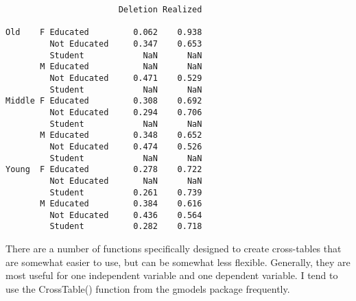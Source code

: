 \documentclass[
  12pt,
  letterpaper]{article}
\newenvironment{Shaded}{\begin{snugshade}}{\end{snugshade}}
\newcommand{\AttributeTok}[1]{\textcolor[rgb]{0.40,0.45,0.13}{#1}}
\newcommand{\CommentTok}[1]{\textcolor[rgb]{0.37,0.37,0.37}{#1}}
\newcommand{\ConstantTok}[1]{\textcolor[rgb]{0.56,0.35,0.01}{#1}}
\newcommand{\DecValTok}[1]{\textcolor[rgb]{0.68,0.00,0.00}{#1}}
\newcommand{\FunctionTok}[1]{\textcolor[rgb]{0.28,0.35,0.67}{#1}}
\newcommand{\NormalTok}[1]{\textcolor[rgb]{0.00,0.23,0.31}{#1}}
\newcommand{\SpecialCharTok}[1]{\textcolor[rgb]{0.37,0.37,0.37}{#1}}
\newcommand{\StringTok}[1]{\textcolor[rgb]{0.13,0.47,0.30}{#1}}
\renewcommand\texttt[1]{{\ttfamily\color{BrickRed}#1}}
\begin{document}
\begin{verbatim}
                       Deletion Realized
                                        
Old    F Educated         0.062    0.938
         Not Educated     0.347    0.653
         Student            NaN      NaN
       M Educated           NaN      NaN
         Not Educated     0.471    0.529
         Student            NaN      NaN
Middle F Educated         0.308    0.692
         Not Educated     0.294    0.706
         Student            NaN      NaN
       M Educated         0.348    0.652
         Not Educated     0.474    0.526
         Student            NaN      NaN
Young  F Educated         0.278    0.722
         Not Educated       NaN      NaN
         Student          0.261    0.739
       M Educated         0.384    0.616
         Not Educated     0.436    0.564
         Student          0.282    0.718
\end{verbatim}

There are a number of functions specifically designed to create
cross-tables that are somewhat easier to use, but can be somewhat less
flexible. Generally, they are most useful for one independent variable
and one dependent variable. I tend to use the \texttt{CrossTable()}
function from the \texttt{gmodels} package frequently.

\begin{Shaded}
\end{Shaded}
\end{document}
